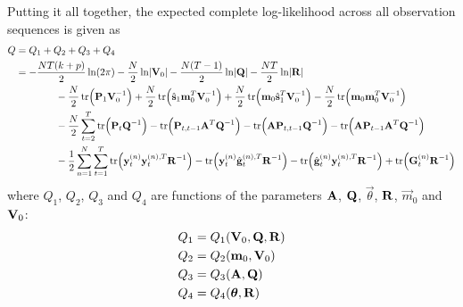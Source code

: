 	Putting it all together, the expected complete log-likelihood across all observation sequences is given as
	\begin{align*}
		Q
			&= Q_1 + Q_2 + Q_3 + Q_4 \\
			&= -\frac{NT(k + p)}{2} \ln(2\pi) - \frac{N}{2} \ln \lvert \mat{V}_0 \rvert - \frac{N(T - 1)}{2} \ln \lvert \mat{Q} \rvert - \frac{NT}{2} \ln \lvert \mat{R} \rvert \\
				&\qquad\qquad -\frac{N}{2} \tr\!\Big( \mat{P}_1 \mat{V}_0^{-1} \Big) + \frac{N}{2} \tr\!\Big( \hat{\vec{s}}_1 \vec{m}_0^T \mat{V}_0^{-1} \Big) + \frac{N}{2} \tr\!\Big( \vec{m}_0 \hat{\vec{s}}_1^T \mat{V}_0^{-1} \Big) - \frac{N}{2} \tr\!\Big(\vec{m}_0 \vec{m}_0^T \mat{V}_0^{-1} \Big) \\
				&\qquad\qquad -\frac{N}{2} \sum_{t = 2}^{T} \tr\!\Big( \mat{P}_t \mat{Q}^{-1} \Big) - \tr\!\Big( \mat{P}_{t, t - 1} \mat{A}^T \mat{Q}^{-1} \Big) - \tr\!\Big( \mat{A} \mat{P}_{t, t - 1} \mat{Q}^{-1} \Big) - \tr\!\Big( \mat{A} \mat{P}_{t - 1} \mat{A}^T \mat{Q}^{-1} \Big) \\
				&\qquad\qquad -\frac{1}{2} \sum_{n = 1}^{N} \sum_{t = 1}^{T} \tr\!\Big( \vec{y}_t^{(n)} \vec{y}_t^{(n), T} \mat{R}^{-1} \Big) - \tr\!\Big( \vec{y}_t^{(n)} \hat{\vec{g}}_t^{(n), T} \mat{R}^{-1} \Big) - \tr\!\Big( \hat{\vec{g}}_t^{(n)} \vec{y}_t^{(n), T} \mat{R}^{-1} \Big) + \tr\!\Big( \mat{G}_t^{(n)} \mat{R}^{-1} \Big)
	\end{align*}
	where \( Q_1 \), \( Q_2 \), \( Q_3 \) and \( Q_4 \) are functions of the parameters \( \boldsymbol{\mathrm{A}} \), \( \boldsymbol{\mathrm{Q}} \), \( \vec{\theta} \), \( \boldsymbol{\mathrm{R}} \), \( \vec{m}_0 \) and \( \boldsymbol{\mathrm{V}}_0 \):
	\begin{align*}
		Q_1 & = Q_1(\boldsymbol{\mathrm{V}}_0, \boldsymbol{\mathrm{Q}}, \boldsymbol{\mathrm{R}}) \\
		Q_2 & = Q_2(\boldsymbol{\mathrm{m}}_0, \boldsymbol{\mathrm{V}}_0)        \\
		Q_3 & = Q_3(\boldsymbol{\mathrm{A}}, \boldsymbol{\mathrm{Q}})            \\
		Q_4 & = Q_4(\boldsymbol{\mathrm{\theta}}, \boldsymbol{\mathrm{R}})
	\end{align*}

